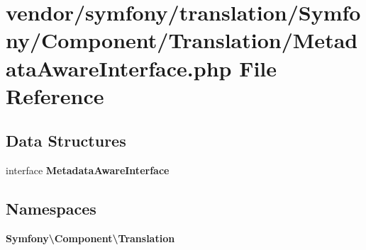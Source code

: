 \section{vendor/symfony/translation/\+Symfony/\+Component/\+Translation/\+Metadata\+Aware\+Interface.php File Reference}
\label{_metadata_aware_interface_8php}
\subsection*{Data Structures}
\begin{DoxyCompactItemize}
\item 
interface {\bf Metadata\+Aware\+Interface}
\end{DoxyCompactItemize}
\subsection*{Namespaces}
\begin{DoxyCompactItemize}
\item 
 {\bf Symfony\textbackslash{}\+Component\textbackslash{}\+Translation}
\end{DoxyCompactItemize}
